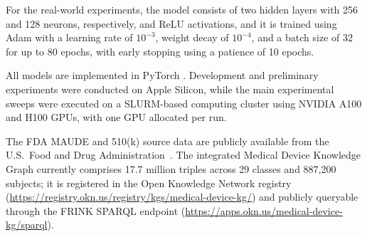 For the real-world experiments, the model consists of two hidden layers with 256 and 128 neurons, respectively, and ReLU activations, and it is trained using Adam \cite{kingma2014method} with a learning rate of \(10^{-3}\), weight decay of \(10^{-4}\), and a batch size of 32 for up to 80 epochs, with early stopping using a patience of 10 epochs.

All models are implemented in PyTorch \cite{paszke2019pytorch}. Development and preliminary experiments were conducted on Apple Silicon, while the main experimental sweeps were executed on a SLURM-based computing cluster using NVIDIA A100 and H100 GPUs, with one GPU allocated per run.

The FDA MAUDE and 510(k) source data are publicly available from the U.S.~Food and Drug Administration~\cite{fda_maude,fda_510k}. The integrated Medical Device Knowledge Graph currently comprises 17.7 million triples across 29 classes and 887{,}200 subjects; it is registered in the Open Knowledge Network registry (\url{https://registry.okn.us/registry/kgs/medical-device-kg/}) and publicly queryable through the FRINK SPARQL endpoint (\url{https://apps.okn.us/medical-device-kg/sparql}).
